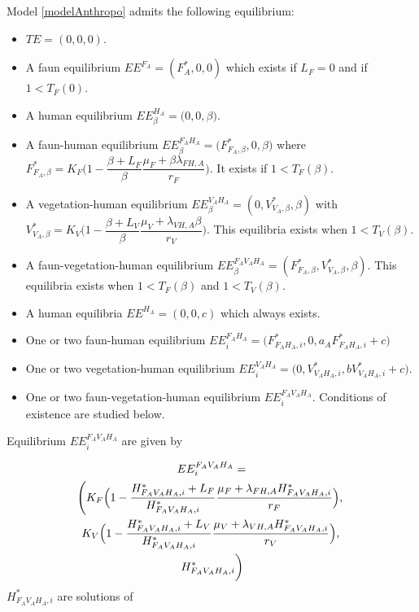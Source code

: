 \documentclass{article}
\newcommand{\lfa}{\lambda_{FH, A}}
\newcommand{\lva}{\lambda_{VH, A}}
\begin{document}
Model \eqref{modelAnthropo} admits the following equilibrium:
\begin{itemize}
\item $TE = (0,0,0)$.
\item A faun equilibrium $EE^{F_A} = (F_A^*, 0, 0)$ which exists if $L_F = 0$ and if $1 < T_F(0)$.
\item A human equilibrium $EE^{H_A}_\beta = \Big(0,0,\beta \Big)$.
\item A faun-human equilibrium $EE^{F_AH_A}_\beta = \Big(F^*_{F_A, \beta}, 0, \beta\Big)$ where $F^*_{F_A, \beta} = K_F \Big(1-\dfrac{\beta + L_F}{\beta}\dfrac{\mu_F + \beta \lfa}{r_F} \Big)$. It exists if $1 < T_F(\beta)$.
\item A vegetation-human equilibrium $EE^{V_AH_A}_\beta = (0, V_{V_A, \beta}^*, \beta)$ with $V_{V_A, \beta}^* = K_V \Big( 1- \dfrac{\beta + L_V}{\beta} \dfrac{\mu_V + \lva \beta}{r_V} \Big)$. This equilibria exists when $1 < T_V(\beta)$.
\item A faun-vegetation-human equilibrium $EE^{F_AV_AH_A}_\beta = (F^*_{F_A, \beta}, V_{V_A, \beta}^*, \beta)$. This equilibria exists when $1 < T_F(\beta)$ and $1 < T_V(\beta)$.
\item A human equilibria $EE^{H_A} = (0, 0, c)$ which always exists.
\item One or two faun-human equilibrium $EE^{F_AH_A}_i = \Big(F^*_{F_AH_A, i}, 0, a_A F^*_{F_AH_A, i}+c\Big)$ 
\item One or two vegetation-human equilibrium $EE^{V_AH_A}_i = \Big(0, V^*_{V_AH_A, i}, bV^*_{V_AH_A, i}+c \Big)$.
\item One or two faun-vegetation-human equilibrium $EE^{F_AV_AH_A}_i$. Conditions of existence are studied below. 
\end{itemize}


Equilibrium $EE^{F_AV_AH_A}_i$ are given by 

\begin{multline}
EE^{F_AV_AH_A}_i =\\ \left(K_F \Big(1 - \dfrac{H^*_{F_AV_AH_A,i} + L_F}{H^*_{F_AV_AH_A,i}}\dfrac{\mu_F + \lfa H^*_{F_AV_AH_A,i}}{r_F}\Big), \right. \\ \left. \vphantom{\dfrac{H}{H}} K_V \Big(1 - \dfrac{H^*_{F_AV_AH_A,i} + L_V}{H^*_{F_AV_AH_A,i}}\dfrac{\mu_V + \lva H^*_{F_AV_AH_A,i}}{r_V}\Big), \right. \\ \left. \vphantom{\dfrac{H}{H}} H^*_{F_AV_AH_A,i} \right)
\end{multline}
$H^*_{F_AV_AH_A,i}$ are solutions of
\end{document}
